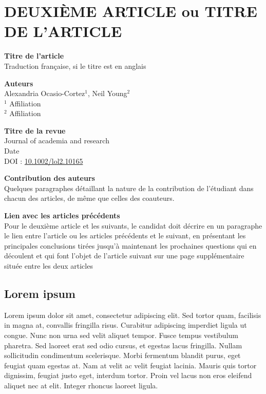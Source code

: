 \chapter{DEUXIÈME ARTICLE ou TITRE DE L’ARTICLE}

{\setlength{\parindent}{0cm}
\textbf{Titre de l'article} %
\\ Traduction française, si le titre est en anglais

\textbf{Auteurs}
\\Alexandria Ocasio-Cortez$^1$, Neil Young$^2$
\\$^1$ Affiliation
\\$^2$ Affiliation

\textbf{Titre de la revue}
\\ Journal of academia and research %
\\ Date %
\\ DOI : \url{10.1002/lol2.10165} %

\textbf{Contribution des auteurs\\}
Quelques paragraphes détaillant la nature de la contribution de l’étudiant dans chacun des articles, de même que celles des coauteurs.

\textbf{Lien avec les articles précédents\\}
Pour le deuxième article et les suivants, le candidat doit décrire en un paragraphe le lien entre l’article ou les articles précédents et le suivant, en présentant les principales conclusions tirées jusqu'à maintenant les prochaines questions qui en découlent et qui font l’objet de l’article suivant sur une page supplémentaire située entre les deux articles

\newpage
\section{Lorem ipsum}
Lorem ipsum dolor sit amet, consectetur adipiscing elit. Sed tortor quam, facilisis in magna at, convallis fringilla risus. Curabitur adipiscing imperdiet ligula ut congue. Nunc non urna sed velit aliquet tempor. Fusce tempus vestibulum pharetra. Sed laoreet erat sed odio cursus, et egestas lacus fringilla. Nullam sollicitudin condimentum scelerisque. Morbi fermentum blandit purus, eget feugiat quam egestas at. Nam at velit ac velit feugiat lacinia. Mauris quis tortor dignissim, feugiat justo eget, interdum tortor. Proin vel lacus non eros eleifend aliquet nec at elit. Integer rhoncus laoreet ligula.

}
